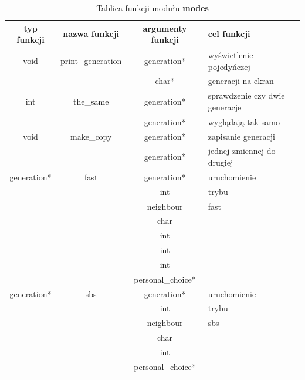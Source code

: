 \documentclass[a4paper]{article}
\begin{document}
\begin{table}[h!]
	\centering

	\caption{\label{table:Tabela2}Tablica funkcji modu\l{}u \textbf{modes}}

        \begin{tabular}{| c | c | c | p{3cm}  |}
                \hline
                typ funkcji & nazwa funkcji & argumenty funkcji & cel funkcji \\ \hline \hline

                void & print\_generation & generation* & wy\'swietlenie pojedy\'nczej \\
                & & char* & generacji na ekran \\ \hline

                int & the\_same & generation* & sprawdzenie czy dwie generacje  \\
                & & generation* & wygl\k{a}daj\k{a} tak samo\\ \hline

                void & make\_copy & generation* & zapisanie generacji\\
                & & generation* & jednej zmiennej do drugiej \\ \hline

                generation* & fast & generation* & uruchomienie \\
                & & int & trybu\\
                & & neighbour & fast \\
                & & char & \\
                & & int & \\
                & & int & \\
                & & int & \\
                & & personal\_choice* & \\ \hline

                generation* & sbs & generation* & uruchomienie \\
                & & int & trybu\\
                & & neighbour & sbs \\
                & & char & \\
                & & int & \\
                & & personal\_choice* & \\ \hline
        \end{tabular}
\end{table}
\end{document}

